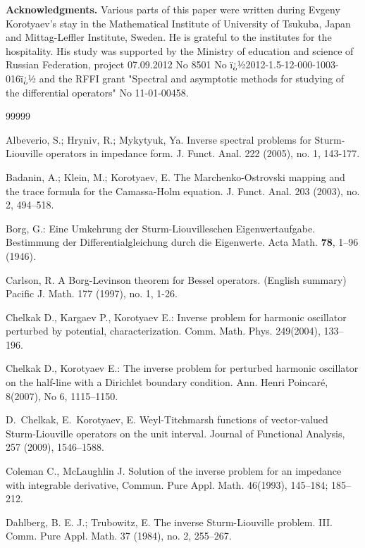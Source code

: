 \documentclass[10pt]{amsart}
\begin{document}
\setlength{\itemsep}{-\parskip} \footnotesize {\noindent}  {\bf
Acknowledgments.} Various parts of this paper were written during
Evgeny Korotyaev's stay in the Mathematical Institute of University
of Tsukuba, Japan and  Mittag-Leffler Institute, Sweden. He is
grateful to the institutes for the hospitality. His study was
supported by the Ministry of education and science of Russian
Federation, project   07.09.2012  No  8501 No
ï¿½2012-1.5-12-000-1003-016ï¿½ and the RFFI grant "Spectral and
asymptotic methods for studying of the differential operators" No
11-01-00458.

\begin{thebibliography}
{99999}\setlength{\itemsep}{-\parskip} \footnotesize

Albeverio, S.; Hryniv, R.; Mykytyuk, Ya. Inverse spectral problems for Sturm-Liouville operators in impedance form. J. Funct. Anal. 222 (2005), no. 1, 143-177.

  Badanin, A.; Klein, M.; Korotyaev, E.
The Marchenko-Ostrovski mapping and the trace formula for the
Camassa-Holm equation. J. Funct. Anal. 203 (2003), no. 2, 494--518.

  Borg, G.: Eine Umkehrung der Sturm-Liouvilleschen Eigenwertaufgabe. Bestimmung der Differentialgleichung
durch die Eigenwerte. Acta Math. {\bf 78}, 1--96 (1946).

 Carlson, R.
A Borg-Levinson theorem for Bessel operators. (English summary)
Pacific J. Math. 177 (1997), no. 1, 1-26.

Chelkak D., Kargaev P., Korotyaev E.: Inverse problem for harmonic oscillator perturbed by potential, characterization. Comm. Math. Phys. 249(2004), 133--196.

 Chelkak D., Korotyaev E.:
The inverse problem for perturbed harmonic oscillator on the half-line with a Dirichlet
boundary condition. Ann. Henri Poincar\'e, 8(2007), No  6, 1115--1150.

 D.~Chelkak, E.~Korotyaev, E.  Weyl-Titchmarsh
functions of vector-valued Sturm-Liouville operators on the unit interval. Journal of Functional Analysis, 257 (2009), 1546--1588.

 Coleman C., McLaughlin J. Solution of the inverse problem
for an impedance with integrable derivative, Commun. Pure Appl. Math.
46(1993),  145--184; 185--212.

 Dahlberg, B. E. J.; Trubowitz, E. The inverse Sturm-Liouville problem. III.
Comm. Pure Appl. Math. 37 (1984), no. 2, 255--267.


\end{thebibliography}
\end{document}
